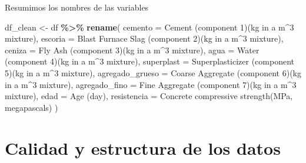 \documentclass[
]{book}
\newenvironment{Shaded}{\begin{snugshade}}{\end{snugshade}}
\newcommand{\AttributeTok}[1]{\textcolor[rgb]{0.13,0.29,0.53}{#1}}
\newcommand{\FunctionTok}[1]{\textcolor[rgb]{0.13,0.29,0.53}{\textbf{#1}}}
\newcommand{\NormalTok}[1]{#1}
\newcommand{\OtherTok}[1]{\textcolor[rgb]{0.56,0.35,0.01}{#1}}
\newcommand{\SpecialCharTok}[1]{\textcolor[rgb]{0.81,0.36,0.00}{\textbf{#1}}}
\newcommand{\StringTok}[1]{\textcolor[rgb]{0.31,0.60,0.02}{#1}}
\begin{document}
Resumimos los nombres de las variables

\begin{Shaded}
\begin{Highlighting}[]
\NormalTok{df\_clean }\OtherTok{\textless{}{-}}\NormalTok{ df }\SpecialCharTok{\%\textgreater{}\%}
  \FunctionTok{rename}\NormalTok{(}
    \AttributeTok{cemento          =} \StringTok{\textasciigrave{}}\AttributeTok{Cement (component 1)(kg in a m\^{}3 mixture)}\StringTok{\textasciigrave{}}\NormalTok{,}
    \AttributeTok{escoria          =} \StringTok{\textasciigrave{}}\AttributeTok{Blast Furnace Slag (component 2)(kg in a m\^{}3 mixture)}\StringTok{\textasciigrave{}}\NormalTok{,}
    \AttributeTok{ceniza           =} \StringTok{\textasciigrave{}}\AttributeTok{Fly Ash (component 3)(kg in a m\^{}3 mixture)}\StringTok{\textasciigrave{}}\NormalTok{,}
    \AttributeTok{agua             =} \StringTok{\textasciigrave{}}\AttributeTok{Water  (component 4)(kg in a m\^{}3 mixture)}\StringTok{\textasciigrave{}}\NormalTok{,}
    \AttributeTok{superplast       =} \StringTok{\textasciigrave{}}\AttributeTok{Superplasticizer (component 5)(kg in a m\^{}3 mixture)}\StringTok{\textasciigrave{}}\NormalTok{,}
    \AttributeTok{agregado\_grueso  =} \StringTok{\textasciigrave{}}\AttributeTok{Coarse Aggregate  (component 6)(kg in a m\^{}3 mixture)}\StringTok{\textasciigrave{}}\NormalTok{,}
    \AttributeTok{agregado\_fino    =} \StringTok{\textasciigrave{}}\AttributeTok{Fine Aggregate (component 7)(kg in a m\^{}3 mixture)}\StringTok{\textasciigrave{}}\NormalTok{,}
    \AttributeTok{edad             =} \StringTok{\textasciigrave{}}\AttributeTok{Age (day)}\StringTok{\textasciigrave{}}\NormalTok{,}
    \AttributeTok{resistencia      =} \StringTok{\textasciigrave{}}\AttributeTok{Concrete compressive strength(MPa, megapascals)}\StringTok{\textasciigrave{}}
\NormalTok{  )}
\end{Highlighting}
\end{Shaded}

\section{Calidad y estructura de los datos}\label{calidad-y-estructura-de-los-datos}
\end{document}
